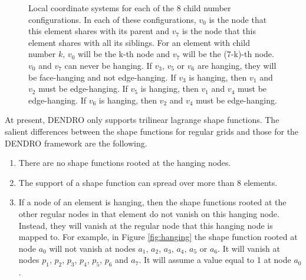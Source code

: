\documentclass[10pt,reqno,a4paper]{report}
\numberwithin{equation}{section}
\begin{document}
\begin{figure}
  \begin{center} 
  \subfigure[Child 0]{  
   \label{fig:child0}
   } 
  \subfigure[Child 1]{
   \label{fig:child1}
   } 
  \subfigure[Child 2]{
   \label{fig:child2}
   } 
  \subfigure[Child 3 ]{
   \label{fig:child3}
   }     
  \subfigure[Child 4]{
   \label{fig:child4}
   } 
  \subfigure[Child 5]{
   \label{fig:child5}
   }
  \subfigure[Child 6]{
   \label{fig:child6}
   }
  \subfigure[Child 7]{
   \label{fig:child7}
   }
  \caption{Local coordinate systems for each of the 8 child number configurations. In each of these configurations, $v_0$ is the node that this element shares with its parent and $v_7$ is the node that this element shares with all its siblings. For an element with child number $k$, $v_0$ will be the k-th node and $v_7$ will be the (7-k)-th node. $v_0$ and $v_7$ can never be hanging. If $v_3$, $v_5$ or $v_6$ are hanging, they will be face-hanging and not edge-hanging. If $v_3$ is hanging, then $v_1$ and $v_2$ must be edge-hanging. If $v_5$ is hanging, then $v_1$ and $v_4$ must be edge-hanging. If $v_6$ is hanging, then $v_2$ and $v_4$ must be edge-hanging.} 
  \end {center}
\end{figure}

At present, DENDRO only supports trilinear lagrange shape functions. The salient differences between the shape functions for regular grids and those for the DENDRO framework are the following.
\begin{enumerate}
\item There are no shape functions rooted at the hanging nodes. 
\item The support of a shape function can spread over more than 8 elements.
\item If a node of an element is hanging, then the shape functions rooted at the other regular nodes in that element do not vanish on this hanging node. Instead, they will vanish at the regular node that this hanging node is mapped to. For example, in Figure \ref{fig:hanging} the shape function rooted at node $a_0$ will not vanish at nodes $a_1$, $a_2$, $a_3$, $a_4$, $a_5$ or $a_6$. It will vanish at nodes $p_1$, $p_2$, $p_3$, $p_4$, $p_5$, $p_6$ and $a_7$. It will assume a value equal to 1 at node $a_0$.
\end{enumerate}
\end{document}
